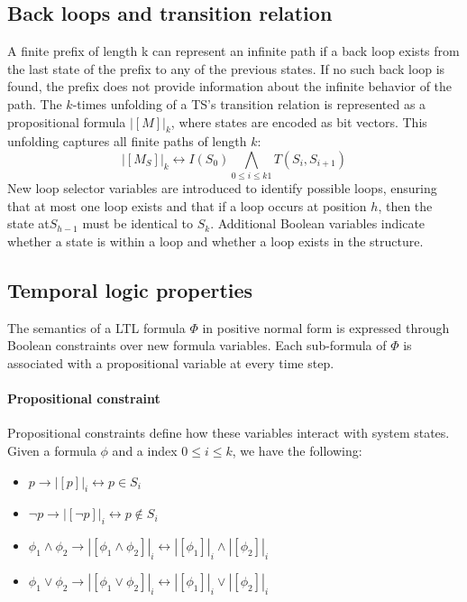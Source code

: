 \subsection{Back loops and transition relation}
A finite prefix of length k can represent an infinite path if a back loop exists from the last state of the prefix to any of the previous states. 
If no such back loop is found, the prefix does not provide information about the infinite behavior of the path. 
The $k$-times unfolding of a TS's transition relation is represented as a propositional formula ${\left\lvert [M]\right\rvert}_k$, where states are encoded as bit vectors.
This unfolding captures all finite paths of length $k$: 
\[{\left\lvert [M_S]\right\rvert}_k\leftrightarrow I(S_0)\bigwedge_{0\leq i \leq k1}T(S_i,S_{i+1}) \]
New loop selector variables are introduced to identify possible loops, ensuring that at most one loop exists and that if a loop occurs at position $h$, then the state at$S_{h-1}$ must be identical to $S_k$. 
Additional Boolean variables indicate whether a state is within a loop and whether a loop exists in the structure.

\subsection{Temporal logic properties}
The semantics of a LTL formula $\Phi$ in positive normal form is expressed through Boolean constraints over new formula variables.
Each sub-formula of $\Phi$  is associated with a propositional variable at every time step.

\paragraph*{Propositional constraint}
Propositional constraints define how these variables interact with system states.
Given a formula $\phi$ and a index $0\leq i\leq k$, we have the following: 
\begin{itemize}
    \item $p\rightarrow{\left\lvert [p]\right\rvert}_i\leftrightarrow p\in S_i$
    \item $\lnot p\rightarrow{\left\lvert [\lnot p]\right\rvert}_i\leftrightarrow p\notin S_i$
    \item $\phi_1\land\phi_2\rightarrow{\left\lvert [\phi_1\land\phi_2]\right\rvert}_i\leftrightarrow{\left\lvert [\phi_1]\right\rvert}_i\land {\left\lvert [\phi_2]\right\rvert}_i$
    \item $\phi_1\lor\phi_2\rightarrow{\left\lvert [\phi_1\lor\phi_2]\right\rvert}_i\leftrightarrow{\left\lvert [\phi_1]\right\rvert}_i\lor {\left\lvert [\phi_2]\right\rvert}_i$
\end{itemize}

